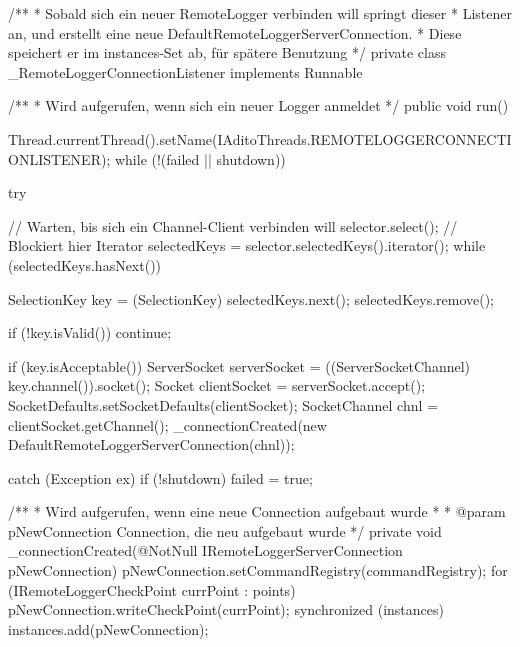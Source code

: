 \begin{spacing}{0.75}
	\begin{javacode}
/**
 * Sobald sich ein neuer RemoteLogger verbinden will springt dieser
 * Listener an, und erstellt eine neue DefaultRemoteLoggerServerConnection.
 * Diese speichert er im instances-Set ab, für spätere Benutzung
 */
private class _RemoteLoggerConnectionListener implements Runnable
{

  /**
   * Wird aufgerufen, wenn sich ein neuer Logger anmeldet
   */
  public void run()
  {
    Thread.currentThread().setName(IAditoThreads.REMOTELOGGERCONNECTIONLISTENER);
    while (!(failed || shutdown))
    {
      try
      {
        // Warten, bis sich ein Channel-Client verbinden will
        selector.select(); // Blockiert hier
        Iterator selectedKeys = selector.selectedKeys().iterator();
        while (selectedKeys.hasNext())
        {
          SelectionKey key = (SelectionKey) selectedKeys.next();
          selectedKeys.remove();
          
          if (!key.isValid())
            continue;
            
          if (key.isAcceptable())
          {
            ServerSocket serverSocket = ((ServerSocketChannel) key.channel()).socket();
            Socket clientSocket = serverSocket.accept();
            SocketDefaults.setSocketDefaults(clientSocket);
            SocketChannel chnl = clientSocket.getChannel();
            _connectionCreated(new DefaultRemoteLoggerServerConnection(chnl));
          }
        }
      }
      catch (Exception ex)
      {
        if (!shutdown)
          failed = true;
      }
    }
  }
  /**
   * Wird aufgerufen, wenn eine neue Connection aufgebaut wurde
   *
   * @param pNewConnection  Connection, die neu aufgebaut wurde
   */
  private void _connectionCreated(@NotNull IRemoteLoggerServerConnection pNewConnection)
  {
    pNewConnection.setCommandRegistry(commandRegistry);
    for (IRemoteLoggerCheckPoint currPoint : points)
    {
      pNewConnection.writeCheckPoint(currPoint);
    }
    synchronized (instances)
    {
      instances.add(pNewConnection);
    }
  }
}\end{javacode}
\end{spacing}